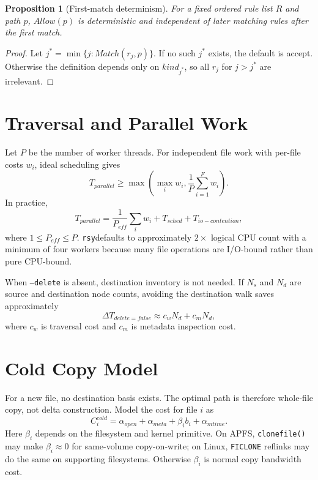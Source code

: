 \documentclass[11pt]{article}
\newtheorem{proposition}{Proposition}
\newcommand{\rsy}{\texttt{rsy}}
\begin{document}
\begin{proposition}[First-match determinism]
For a fixed ordered rule list $R$ and path $p$, $Allow(p)$ is deterministic and independent of later matching rules after the first match.
\end{proposition}
\begin{proof}
Let $j^*=\min\{j:Match(r_j,p)\}$. If no such $j^*$ exists, the default is accept. Otherwise the definition depends only on $kind_{j^*}$, so all $r_j$ for $j>j^*$ are irrelevant.
\end{proof}

\section{Traversal and Parallel Work}

Let $P$ be the number of worker threads. For independent file work with per-file costs $w_i$, ideal scheduling gives
\begin{equation}
  T_{parallel} \ge \max\left(\max_i w_i,\frac{1}{P}\sum_{i=1}^{F}w_i\right).
\end{equation}
In practice,
\begin{equation}
  T_{parallel} = \frac{1}{P_{eff}}\sum_i w_i + T_{sched}+T_{io-contention},
\end{equation}
where $1\le P_{eff}\le P$. \rsy defaults to approximately $2\times$ logical CPU count with a minimum of four workers because many file operations are I/O-bound rather than pure CPU-bound.

When \texttt{--delete} is absent, destination inventory is not needed. If $N_s$ and $N_d$ are source and destination node counts, avoiding the destination walk saves approximately
\begin{equation}
  \Delta T_{delete=false} \approx c_w N_d + c_m N_d,
\end{equation}
where $c_w$ is traversal cost and $c_m$ is metadata inspection cost.

\section{Cold Copy Model}

For a new file, no destination basis exists. The optimal path is therefore whole-file copy, not delta construction. Model the cost for file $i$ as
\begin{equation}
  C_i^{cold} = \alpha_{open}+\alpha_{meta}+\beta_i b_i+\alpha_{mtime}.
\end{equation}
Here $\beta_i$ depends on the filesystem and kernel primitive. On APFS, \texttt{clonefile()} may make $\beta_i\approx0$ for same-volume copy-on-write; on Linux, \texttt{FICLONE} reflinks may do the same on supporting filesystems. Otherwise $\beta_i$ is normal copy bandwidth cost.
\end{document}
